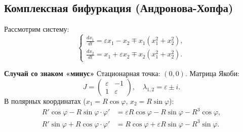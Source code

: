 	\newpage
	
	\subsection{Комплексная бифуркация (Андронова-Хопфа)}
	
	Рассмотрим систему:
	\begin{equation}
		\begin{cases}
			\frac{d x_1}{d t} = \varepsilon x_1 - x_2 \mp x_1 (x_1^2 + x_2^2), \\
			\frac{d x_2}{d t} = x_1 + \varepsilon x_2 \mp x_2 (x_1^2 + x_2^2).
		\end{cases}
	\end{equation}
	
	\textbf{Случай со знаком «минус»}
	\newline 
	Стационарная точка: \((0, 0)\). Матрица Якоби:
	\begin{equation}
		J = \begin{pmatrix} \varepsilon & -1 \\ 1 & \varepsilon \end{pmatrix}, \quad \lambda_{1,2} = \varepsilon \pm i.
	\end{equation}
	В полярных координатах (\( x_1 = R \cos \varphi \), \( x_2 = R \sin \varphi \)):
	\begin{align}
		R'\cos\varphi - R\sin\varphi \cdot \varphi' &= \varepsilon R\cos\varphi - R\sin\varphi - R^3\cos\varphi, \\
		R'\sin\varphi + R\cos\varphi \cdot \varphi' &= R\cos\varphi + \varepsilon R\sin\varphi - R^3\sin\varphi.
	\end{align}
	
